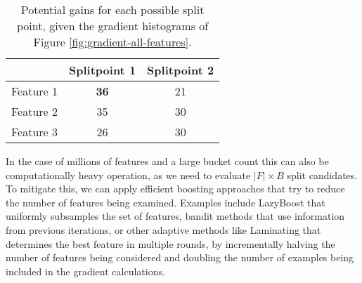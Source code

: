 \begin{table}
	\centering
	\begin{tabular}{ccc}
		\toprule
		& Splitpoint 1 & Splitpoint 2 \\
		\midrule
		Feature 1 & \textbf{36} & 21 \\
		Feature 2 & 35 & 30 \\
		Feature 3 & 26 & 30 \\
		\bottomrule
	\end{tabular}
	\caption{Potential gains for each possible split point, given
	the gradient histograms of Figure \ref{fig:gradient-all-features}.}
	\label{tab:gains}
\end{table}

In the case of millions of features and a large bucket count this can also be
computationally heavy operation, as we need to evaluate $|F| \times B$ split candidates.
To mitigate this, we can apply efficient boosting approaches that try
to reduce the number of features being examined. Examples include LazyBoost \cite{lazyboost}
that uniformly subsamples the set of features,
bandit methods \cite{bandits-boosting} that use information from previous iterations, or other adaptive
methods like Laminating \cite{laminating} that determines the best feature in multiple rounds, by incrementally
halving the number of features being considered and doubling the number of examples being
included in the gradient calculations.

